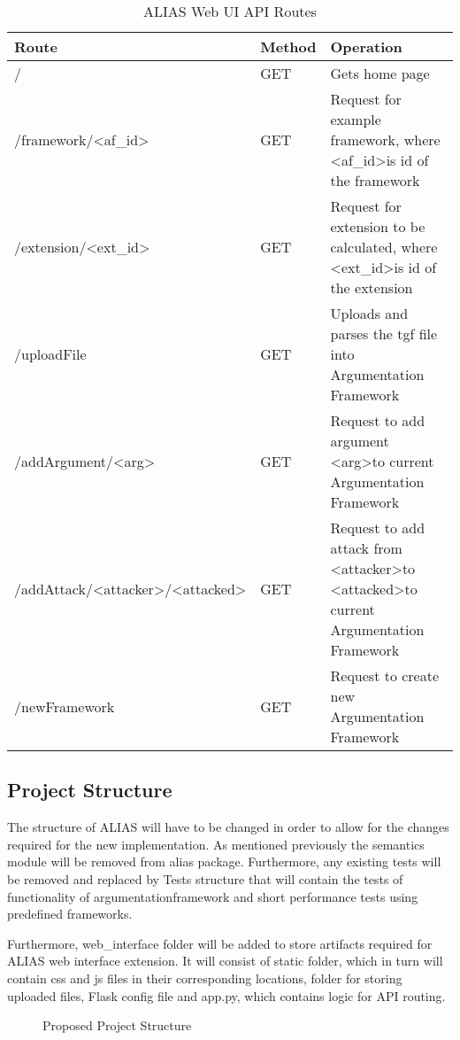 \begin{table}[]
	\centering
		\begin{tabular}{|p{7cm}|p{1.5cm}|p{4.5cm}|}
			\hline
			\textbf{Route} & \textbf{Method} & \textbf{Operation}  \\ \hline \hline
			/ & GET & Gets home page \\ \hline
			/framework/\textless{}af\_id\textgreater{} & GET & Request for example framework, where \textless{}af\_id\textgreater is id of the framework \\ \hline
			/extension/\textless{}ext\_id\textgreater{} & GET & Request for extension to be calculated, where \textless{}ext\_id\textgreater is id of the extension \\ \hline
			/uploadFile & GET & Uploads and parses the tgf file into Argumentation Framework \\ \hline
			/addArgument/\textless{}arg\textgreater{} & GET & Request to add argument \textless{}arg\textgreater to current Argumentation Framework \\ \hline
			/addAttack/\textless{}attacker\textgreater{}/\textless{}attacked\textgreater{} & GET & Request to add attack from \textless{}attacker\textgreater to \textless{}attacked\textgreater to current Argumentation Framework \\ \hline
			/newFramework & GET & Request to create new Argumentation Framework \\ \hline
		\end{tabular}%
	\caption{ALIAS Web UI API Routes}
	\label{table:apiRoutes}
\end{table}

\subsection{Project Structure}
The structure of ALIAS will have to be changed in order to allow for the changes required for the new implementation. As mentioned previously the semantics module will be removed from alias package. Furthermore, any existing tests will be removed and replaced by Tests structure that will contain the tests of functionality of argumentationframework and short performance tests using predefined frameworks.

Furthermore, web\_interface folder will be added to store artifacts required for ALIAS web interface extension. It will consist of static folder, which in turn will contain css and js files in their corresponding locations, folder for storing uploaded files, Flask config file and app.py, which contains logic for API routing.

\begin{figure}[!ht]
	\caption{Proposed Project Structure}
	\label{fig:structureTree}
\end{figure}